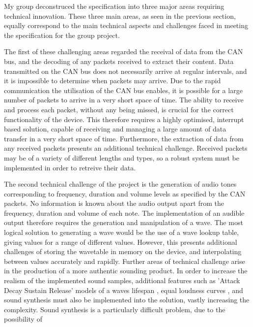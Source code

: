 My group deconstruced the specification into three major areas requiring 
technical innovation. 
These three main areas, as seen in the previous section, 
equally correspond to the main technical aspects and challenges faced in 
meeting the specification for the group project. 
\par\bigskip\noindent
The first of these challenging areas regarded the receival of data from the CAN 
bus, and the decoding of any packets received to extract their content. 
Data transmitted on the CAN bus does not necessarily arrive at regular intervals, 
and it is impossible to determine when packets may arrive.
Due to the rapid communication the utilisation of the CAN bus enables, it is 
possible for a large number of packets to arrive in a very short space of time.
The ability to receive and process each packet, without any being missed, is 
crucial for the correct functionality of the device. 
This therefore requires a highly optimised, interrupt based solution, capable of
receiving and managing a large amount of data transfer in a very short space of
time. 
Furthermore, the extraction of data from any received packets presents an 
additional technical challenge. 
Received packets may be of a variety of different lengths and types, so a robust 
system must be implemented in order to retreive their data. 
\par\bigskip\noindent
The second technical challenge of the project is the generation of audio tones 
corresponding to frequency, duration and volume levels as specified by the CAN 
packets. 
No information is known about the audio output  apart from the frequency, 
duration and volume of each note. 
The implementation of an audible output therefore requires the generation and 
manipulation of a wave. 
The most logical solution to generating a wave would be the use of a wave lookup 
table, giving values for a range of different values. 
However, this presents additional challenges of storing the wavetable in memory 
on the device, and interpolating between values accurately and rapidly. 
Further areas of technical challenge arise in the production of a more authentic 
sounding product. 
In order to increase the realism of the implemented sound samples, additional 
features such as 'Attack Decay 
Sustain Release' models of a waves lifespan \cite{asr-book}, equal loudness 
curves \cite{kefauver2001audio}, and sound synthesis \cite{miranda2012computer} 
must also be implemented into the solution, vastly increasing the complexity. 
Sound synthesis is a particularly difficult problem, due to the possibility of 
